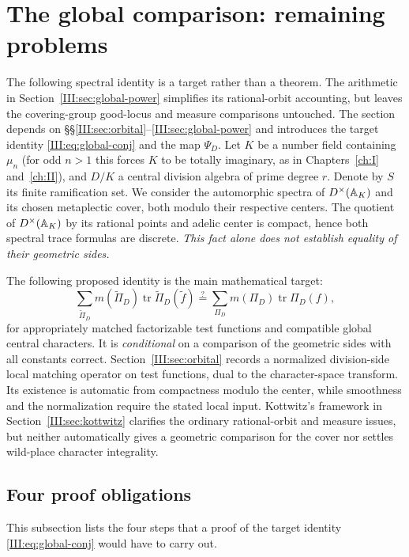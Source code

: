 \section{The global comparison: remaining problems}\label{III:sec:global}
The following spectral identity is a target rather than a theorem.
The arithmetic in Section~\ref{III:sec:global-power} simplifies its
rational-orbit accounting, but leaves the covering-group good-locus
and measure comparisons untouched. The section depends on \S\S\ref{III:sec:orbital}--\ref{III:sec:global-power} and introduces the target identity \eqref{III:eq:global-conj} and the map $\Psi_D$.
Let $K$ be a number field containing $\mu_n$ (for odd $n>1$ this forces $K$ to be totally imaginary, as in Chapters~\ref{ch:I} and~\ref{ch:II}), and $D/K$ a central division algebra of prime degree $r$. Denote by $S$ its finite ramification set. We consider the automorphic spectra of $D^\times(\mathbb A_K)$ and its chosen metaplectic cover, both modulo their respective centers. The quotient of $D^\times(\mathbb A_K)$ by its rational points and adelic center is compact, hence both spectral trace formulas are discrete. \emph{This fact alone does not establish equality of their geometric sides.}

The following proposed identity is the main mathematical target:
\begin{equation}\label{III:eq:global-conj}
\sum_{\widetilde\Pi_D}m(\widetilde\Pi_D)
\operatorname{tr}\widetilde\Pi_D(\widetilde f)
\stackrel{?}{=}
\sum_{\Pi_D}m(\Pi_D)\operatorname{tr}\Pi_D(f),
\end{equation}
for appropriately matched factorizable test functions and compatible global central characters. It is \emph{conditional} on a comparison of the geometric sides with all constants correct. Section~\ref{III:sec:orbital} records a normalized division-side local
matching operator on test functions, dual to the character-space
transform. Its existence is automatic from compactness modulo the
center, while smoothness and the normalization require the stated
local input. Kottwitz's framework in Section~\ref{III:sec:kottwitz}
clarifies the ordinary rational-orbit and measure issues, but neither
automatically gives a geometric comparison for the cover nor
settles wild-place character integrality.

\subsection{Four proof obligations}
This subsection lists the four steps that a proof of the target identity \eqref{III:eq:global-conj} would have to carry out.

